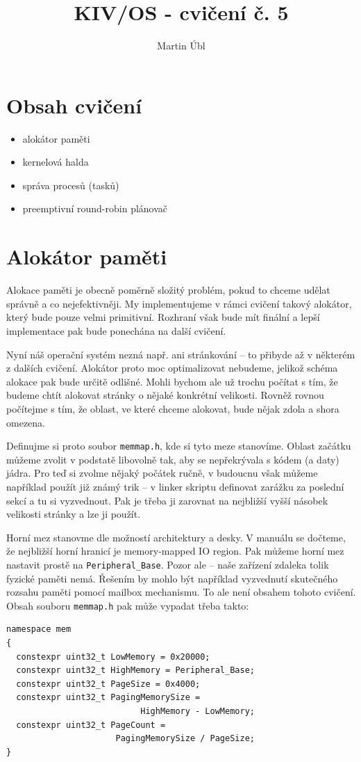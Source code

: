 \documentclass{article}
\author{Martin Úbl}
\title{KIV/OS - cvičení č. 5}
\begin{document}
\maketitle



\section{Obsah cvičení}

\begin{itemize}
	\item alokátor paměti
	\item kernelová halda
	\item správa procesů (tasků)
	\item preemptivní round-robin plánovač
\end{itemize}

\section{Alokátor paměti}

Alokace paměti je obecně poměrně složitý problém, pokud to chceme udělat správně a co nejefektivněji. My implementujeme v rámci cvičení takový alokátor, který bude pouze velmi primitivní. Rozhraní však bude mít finální a lepší implementace pak bude ponechána na další cvičení.

Nyní náš operační systém nezná např. ani stránkování -- to přibyde až v některém z dalších cvičení. Alokátor proto moc optimalizovat nebudeme, jelikož schéma alokace pak bude určitě odlišné. Mohli bychom ale už trochu počítat s tím, že budeme chtít alokovat stránky o nějaké konkrétní velikosti. Rovněž rovnou počítejme s tím, že oblast, ve které chceme alokovat, bude nějak zdola a shora omezena.

Definujme si proto soubor \texttt{memmap.h}, kde si tyto meze stanovíme. Oblast začátku můžeme zvolit v podstatě libovolně tak, aby se nepřekrývala s kódem (a daty) jádra. Pro teď si zvolme nějaký počátek ručně, v budoucnu však můžeme například použít již známý trik -- v linker skriptu definovat zarážku za poslední sekcí a tu si vyzvednout. Pak je třeba ji zarovnat na nejbližší vyšší násobek velikosti stránky a lze ji použít.

Horní mez stanovme dle možností architektury a desky. V manuálu se dočteme, že nejbližší horní hranicí je memory-mapped IO region. Pak můžeme horní mez nastavit prostě na \texttt{Peripheral\_Base}. Pozor ale -- naše zařízení zdaleka tolik fyzické paměti nemá. Řešením by mohlo být například vyzvednutí skutečného rozsahu paměti pomocí mailbox mechanismu. To ale není obsahem tohoto cvičení.
\newpage
Obsah souboru \texttt{memmap.h} pak může vypadat třeba takto:
\begin{lstlisting}
namespace mem
{
  constexpr uint32_t LowMemory = 0x20000;
  constexpr uint32_t HighMemory = Peripheral_Base;
  constexpr uint32_t PageSize = 0x4000;
  constexpr uint32_t PagingMemorySize =
                           HighMemory - LowMemory;
  constexpr uint32_t PageCount =
                      PagingMemorySize / PageSize;
}
\end{lstlisting}
\end{document}
